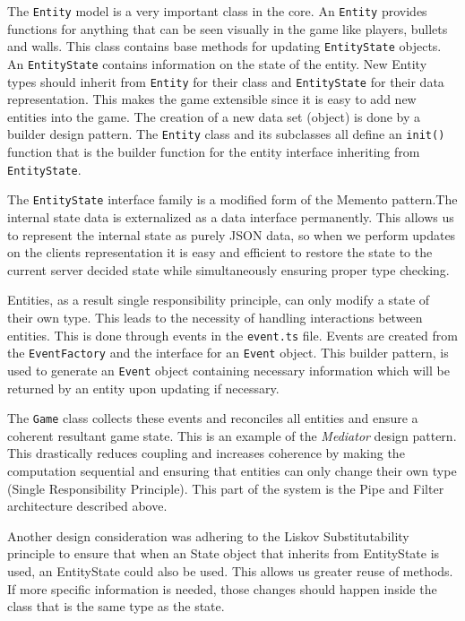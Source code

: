 \documentclass[12pt]{report}
\begin{document}
The \texttt{Entity} model is a very important class in the core. An \texttt{Entity} provides functions for anything that can be seen visually in the game like players, bullets and walls. This class contains base methods for updating \texttt{EntityState} objects. An \texttt{EntityState} contains information on the state of the entity. New Entity types should inherit from \texttt{Entity} for their class and \texttt{EntityState} for their data representation. This makes the game extensible since it is easy to add new entities into the game. The creation of a new data set (object) is done by a builder design pattern. The \texttt{Entity} class and its subclasses all define an \texttt{init()} function that is the builder function for the entity interface inheriting from \texttt{EntityState}. 

The \texttt{EntityState} interface family is a modified form of the Memento pattern.The internal state data is externalized as a data interface permanently. This allows us to represent the internal state as purely JSON data, so when we perform updates on the clients representation it is easy and efficient to restore the state to the current server decided state while simultaneously ensuring proper type checking. 

Entities, as a result single responsibility principle, can only modify a state of their own type. This leads to the necessity of handling interactions between entities. This is done through events in the  \texttt{event.ts} file. Events are created from the \texttt{EventFactory} and the interface for an \texttt{Event} object. This builder pattern, is used to generate an \texttt{Event} object containing necessary information which will be returned by an entity upon updating if necessary.

The \texttt{Game} class collects these events and reconciles all entities and ensure a coherent resultant game state. This is an example of the \textit{Mediator} design pattern. This drastically reduces coupling and increases coherence by making the computation sequential and ensuring that entities can only change their own type (Single Responsibility Principle). This part of the system is the Pipe and Filter architecture described above. 

Another design consideration was adhering to the Liskov Substitutability principle to ensure that when an State object that inherits from EntityState is used, an EntityState could also be used. This allows us greater reuse of methods. If more specific information is needed, those changes should happen inside the class that is the same type as the state.
\end{document}

